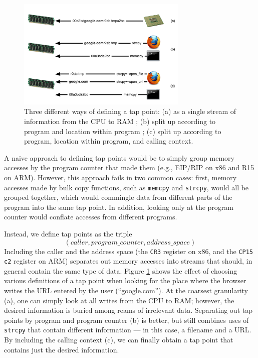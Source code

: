 \begin{figure}[t]
\begin{center}
\includegraphics[width=3.2in]{tappoint.pdf}
\end{center}
\caption{Three different ways of defining a tap point: (a) as a single
stream of information from the CPU to RAM ; (b) split up according to
program and location within program ; (c) split up according to program,
location within program, and calling context.}
\label{fig:tappoint}
\end{figure}

A naive approach to defining tap points would be to simply group memory
accesses by the program counter that made them (e.g., EIP/RIP on x86 and
R15 on ARM). However, this approach fails in two common cases: first,
memory accesses made by bulk copy functions, such as \texttt{memcpy} and
\texttt{strcpy}, would all be grouped together, which would commingle
data from different parts of the program into the same tap point. In
addition, looking only at the program counter would conflate accesses
from different programs.

Instead, we define tap points as the triple \[ (caller,
program\_counter, address\_space) \] Including the caller and the
address space (the \texttt{CR3} register on x86, and the \texttt{CP15
c2} register on ARM) separates out memory accesses into streams that
should, in general contain the same type of data. Figure
\ref{fig:tappoint} shows the effect of choosing various definitions of a
tap point when looking for the place where the browser writes the URL
entered by the user (``google.com'').  At the coarsest granularity (a),
one can simply look at all writes from the CPU to RAM; however, the
desired information is buried among reams of irrelevant data.
Separating out tap points by program and program counter (b) is better,
but still combines uses of \texttt{strcpy} that contain different
information --- in this case, a filename and a URL. By including the
calling context (c), we can finally obtain a tap point that contains
just the desired information.

